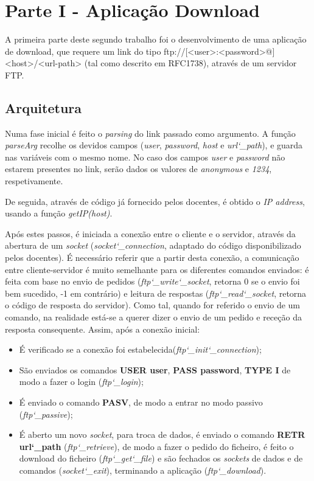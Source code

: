 \section*{Parte I - Aplicação Download}
A primeira parte deste segundo trabalho foi o desenvolvimento de uma aplicação de download, que requere
um link do tipo ftp://[<user>:<password>@]<host>/<url-path> (tal como descrito em RFC1738), através de um servidor FTP.

\subsection*{Arquitetura}
Numa fase inicial é feito o \textit{parsing} do link passado como argumento.
A função \textit{parseArg} recolhe os devidos campos (\textit{user}, \textit{password}, \textit{host} e \textit{url\char`_path}), e guarda nas variáveis com o mesmo nome.
No caso dos campos \textit{user} e \textit{password} não estarem presentes no link, serão dados os valores de \textit{anonymous} e \textit{1234}, respetivamente.

De seguida, através de código já fornecido pelos docentes, é obtido o \textit{IP address}, usando a função \textit{getIP(host)}.

Após estes passos, é iniciada a conexão entre o cliente e o servidor, através da abertura de um \textit{socket} (\textit{socket\char`_connection}, adaptado do código disponibilizado pelos docentes).
É necessário referir que a partir desta conexão, a comunicação entre cliente-servidor é muito semelhante para os diferentes comandos enviados: é feita com base no envio de pedidos (\textit{ftp\char`_write\char`_socket}, retorna 0 se o envio foi bem sucedido, -1 em contrário) e leitura de respostas (\textit{ftp\char`_read\char`_socket}, retorna o código de resposta do servidor). Como tal, quando for referido o envio de um comando, na realidade está-se a querer dizer o envio de um pedido e receção da resposta consequente.
Assim, após a conexão inicial:
\begin{itemize}
\item É verificado se a conexão foi estabelecida(\textit{ftp\char`_init\char`_connection});
\item São enviados os comandos \textbf{USER user}, \textbf{PASS password}, \textbf{TYPE I} de modo a fazer o login (\textit{ftp\char`_login});
\item É enviado o comando \textbf{PASV}, de modo a entrar no modo passivo (\textit{ftp\char`_passive});
\item É aberto um novo \textit{socket}, para troca de dados, é enviado o comando \textbf{RETR url\char`_path} (\textit{ftp\char`_retrieve}), de modo a fazer o pedido do ficheiro, é feito o download do ficheiro (\textit{ftp\char`_get\char`_file}) e são fechados os \textit{sockets} de dados e de comandos (\textit{socket\char`_exit}), terminando a aplicação (\textit{ftp\char`_download}).
\end{itemize}
